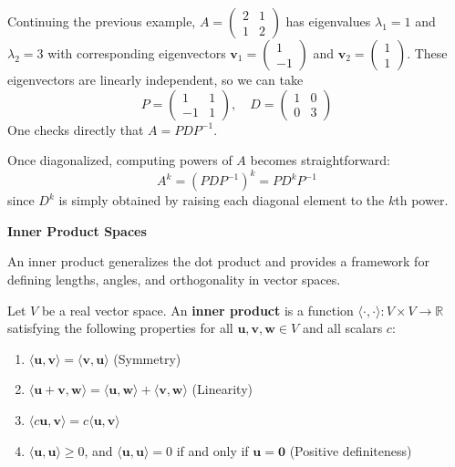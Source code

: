 \begin{example}
Continuing the previous example, $A = \begin{pmatrix} 2 & 1 \\ 1 & 2 \end{pmatrix}$ has eigenvalues $\lambda_1=1$ and $\lambda_2=3$ with corresponding eigenvectors $\mathbf{v}_1 = \begin{pmatrix} 1 \\ -1 \end{pmatrix}$ and $\mathbf{v}_2 = \begin{pmatrix} 1 \\ 1 \end{pmatrix}$. These eigenvectors are linearly independent, so we can take
\[
P = \begin{pmatrix} 1 & 1 \\ -1 & 1 \end{pmatrix}, \quad D = \begin{pmatrix} 1 & 0 \\ 0 & 3 \end{pmatrix}
\]
One checks directly that $A = PDP^{-1}$.
\end{example}

Once diagonalized, computing powers of $A$ becomes straightforward:
\[
A^k = (PDP^{-1})^k = PD^k P^{-1}
\]
since $D^k$ is simply obtained by raising each diagonal element to the $k$th power.

\textbf{Inner Product Spaces}

An inner product generalizes the dot product and provides a framework for defining lengths, angles, and orthogonality in vector spaces.

\begin{definition}
Let $V$ be a real vector space. An \textbf{inner product} is a function $\langle \cdot, \cdot \rangle: V \times V \to \mathbb{R}$ satisfying the following properties for all $\mathbf{u}, \mathbf{v}, \mathbf{w} \in V$ and all scalars $c$:
\begin{enumerate}
    \item $\langle \mathbf{u}, \mathbf{v} \rangle = \langle \mathbf{v}, \mathbf{u} \rangle$ (Symmetry)
    \item $\langle \mathbf{u} + \mathbf{v}, \mathbf{w} \rangle = \langle \mathbf{u}, \mathbf{w} \rangle + \langle \mathbf{v}, \mathbf{w} \rangle$ (Linearity)
    \item $\langle c\mathbf{u}, \mathbf{v} \rangle = c\langle \mathbf{u}, \mathbf{v} \rangle$
    \item $\langle \mathbf{u}, \mathbf{u} \rangle \ge 0$, and $\langle \mathbf{u}, \mathbf{u} \rangle = 0$ if and only if $\mathbf{u} = \mathbf{0}$ (Positive definiteness)
\end{enumerate}
\end{definition}

